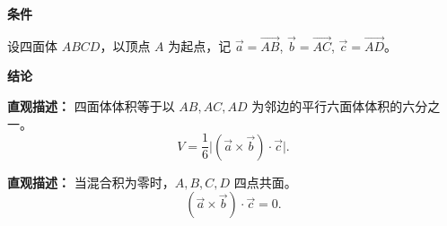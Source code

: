 \begin{statementbox}

	\textbf{\textcolor{CStatement}{条件}}
	\begin{description}[style=nextline, leftmargin=2.8em, labelsep=0.5em, itemsep=0.35em]
		\item[\textbf{\textcolor{CStatement}{条件 1（起始顶点向量）：}}] 设四面体 $ABCD$，以顶点 $A$ 为起点，记 $\vec{a}=\overrightarrow{AB}$, $\vec{b}=\overrightarrow{AC}$, $\vec{c}=\overrightarrow{AD}$。
	\end{description}

	\textbf{\textcolor{CStatement}{结论}}
	\begin{description}[style=nextline, leftmargin=2.8em, labelsep=0.5em, itemsep=0.45em]
		\item[\textbf{\textcolor{CStatement}{结论一（体积公式）：}}]
			\textbf{\textcolor{CStatement}{直观描述：}}
			四面体体积等于以 $AB,AC,AD$ 为邻边的平行六面体体积的六分之一。
			\[
				V = \frac{1}{6}\bigl|(\vec{a}\times\vec{b})\cdot\vec{c}\bigr|.
			\]
		\item[\textbf{\textcolor{CStatement}{推广结论（共面判据）：}}]
			\textbf{\textcolor{CStatement}{直观描述：}}
			当混合积为零时，$A,B,C,D$ 四点共面。
			\[
				(\vec{a}\times\vec{b})\cdot\vec{c}=0.
			\]
	\end{description}

\end{statementbox}
